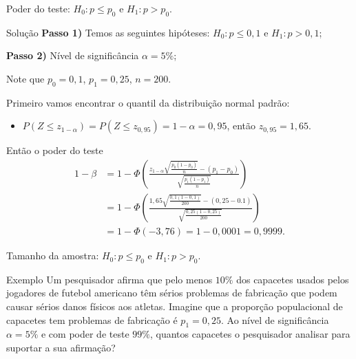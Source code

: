 \documentclass[8pt]{beamer}
\begin{document}
\begin{frame}{Poder do teste: $H_0: p \leq p_0$ e $H_1: p > p_0$.}

\begin{block}{Solução}
	\textbf{Passo 1)} Temos as seguintes hipóteses: $H_0: p \leq 0,1$ e $H_1: p > 0,1$;
	
	\textbf{Passo 2)} Nível de significância $\alpha=5\%$;
	
	Note que $p_0=0,1$, $p_1=0,25$, $n= 200$.
	
	Primeiro vamos encontrar o quantil da distribuição normal padrão:
	\begin{itemize}
		\item $P\left( Z \leq z_{1-\alpha} \right) =  P (Z \leq z_{0,95}) = 1-\alpha = 0,95$, então $z_{0,95} = 1,65$.
	\end{itemize}
	
	Então o poder do teste
	\begin{align*}
	1-\beta &= 1-  \Phi\left( \frac{ z_{1-\alpha} \sqrt{ \frac{p_0(1-p_0)}{n}} - (p_1 - p_0)  }{ \sqrt{ \frac{ p_1(1-p_1) }{ n } } } \right)\\ 
	&= 1 - \Phi \left( \frac{ 1,65 \sqrt{ \frac{0,1(1-0,1)}{200}} - (0,25 - 0.1)  }{ \sqrt{ \frac{ 0,25(1-0,25) }{ 200 } } }  \right) \\
	&= 1 - \Phi\left(-3,76\right) = 1 - 0,0001=0,9999.
	\end{align*}
\end{block}

\end{frame}

\begin{frame}{Tamanho da amostra: $H_0: p \leq p_0$ e $H_1: p > p_0$.}

\large

\begin{block}{Exemplo}
	Um pesquisador afirma que pelo menos $10\%$ dos capacetes usados pelos jogadores de futebol americano têm sérios problemas de fabricação que podem causar sérios danos físicos aos atletas. Imagine que a proporção populacional de capacetes tem problemas de fabricação é $p_1=0,25$. Ao nível de significância $\alpha=5\%$ e com poder de teste $99\%$, quantos capacetes o pesquisador analisar para suportar a sua afirmação? 
\end{block}
\vfill


\normalsize
\end{frame}
\end{document}
